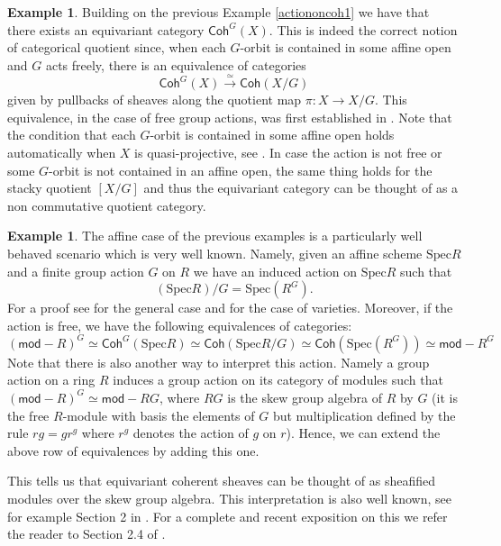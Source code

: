 \documentclass[10pt]{amsart}
\theoremstyle{definition}
\newtheorem{example}[theorem]{Example}
\newcommand{\Spe}{ {\mathrm{Spec} } }
\begin{document}
\begin{example}\label{actiononcoh2}
Building on the previous Example \ref{actiononcoh1} we have that there exists an equivariant category $\mathsf{Coh}^G(X)$. This is indeed the correct notion of categorical quotient since, when each $G$-orbit is contained in some affine open and $G$ acts freely, there is an equivalence of categories
\[
\mathsf{Coh}^G(X) \xrightarrow{\simeq} \mathsf{Coh}(X/G)
\]
given by pullbacks of sheaves along the quotient map $\pi \colon X \to X/G$. This equivalence, in the case of free group actions, was first established in \cite[Proposition 2, Chapter II, Paragraph 7]{MumfordAbelian}. Note that the condition that each $G$-orbit is contained in some affine open holds automatically when $X$ is quasi-projective, see \cite[Chapter II, Paragraph 7, Remark]{MumfordAbelian}. In case the action is not free or some $G$-orbit is not contained in an affine open, the same thing holds for the stacky quotient $[X/G]$ and thus the equivariant category can be thought of as a non commutative quotient category.
\end{example}

\begin{example}\label{exm:quotaffine}
    The affine case of the previous examples is a particularly well behaved scenario which is very well known. Namely, given an affine scheme $\Spe R$ and a finite group action $G$ on $R$ we have an induced action on $\Spe R$ such that
\begin{equation*}
(\Spe R)/G  = \Spe (R^G).
\end{equation*}
For a proof see \cite[Proposition. 4.8]{EdixhovenGeerMoonen_AV} for the general case and \cite[Chapter II, Paragraph 7]{MumfordAbelian} for the case of varieties. 
Moreover, if the action is free, we have the following equivalences of categories:
$$ (\mathsf{mod-}R)^G \simeq \mathsf{Coh}^G(\Spe R) \simeq  \mathsf{Coh}(\Spe R /G) \simeq \mathsf{Coh}(\Spe (R^G)) \simeq \mathsf{mod-}R^G $$
Note that there is also another way to interpret this action. Namely a group action on a ring $R$ induces a group action on its category of modules such that $(\mathsf{mod-}R)^G \simeq \mathsf{mod}-RG$, where $RG$ is the skew group algebra of $R$ by $G$ (it is the free $R$-module with basis the elements of $G$ but multiplication defined by the rule $rg = gr^g$ where $r^g$ denotes the action of $g$ on $r$). Hence, we can extend the above row of equivalences by adding this one.  

This tells us that equivariant coherent sheaves can be thought of as sheafified modules over the skew group algebra. This interpretation is also well known, see for example Section 2 in \cite{MR4130074}.
 For a complete and recent exposition on this we refer the reader to  Section 2.4 of 
\cite{karakikes2025equivariantrecollementssingularequivalences}.
\end{example}
\end{document}
